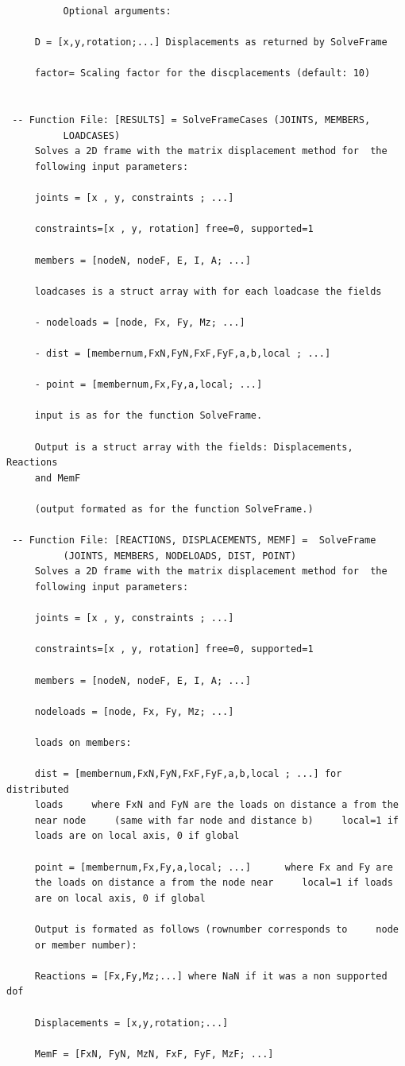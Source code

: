 \documentclass[a4paper]{article}
\begin{document}
\begin{verbatim}
     	  Optional arguments:

     D = [x,y,rotation;...] Displacements as returned by SolveFrame

     factor= Scaling factor for the discplacements (default: 10)


 -- Function File: [RESULTS] = SolveFrameCases (JOINTS, MEMBERS,
          LOADCASES)
     Solves a 2D frame with the matrix displacement method for  the
     following input parameters:

     joints = [x , y, constraints ; ...]

     constraints=[x , y, rotation] free=0, supported=1

     members = [nodeN, nodeF, E, I, A; ...]

     loadcases is a struct array with for each loadcase the fields

     - nodeloads = [node, Fx, Fy, Mz; ...]

     - dist = [membernum,FxN,FyN,FxF,FyF,a,b,local ; ...]

     - point = [membernum,Fx,Fy,a,local; ...]

     input is as for the function SolveFrame.

     Output is a struct array with the fields: Displacements, Reactions
     and MemF

     (output formated as for the function SolveFrame.)

 -- Function File: [REACTIONS, DISPLACEMENTS, MEMF] =  SolveFrame
          (JOINTS, MEMBERS, NODELOADS, DIST, POINT)
     Solves a 2D frame with the matrix displacement method for  the
     following input parameters:

     joints = [x , y, constraints ; ...]

     constraints=[x , y, rotation] free=0, supported=1

     members = [nodeN, nodeF, E, I, A; ...]

     nodeloads = [node, Fx, Fy, Mz; ...]

     loads on members:

     dist = [membernum,FxN,FyN,FxF,FyF,a,b,local ; ...] for distributed
     loads     where FxN and FyN are the loads on distance a from the
     near node     (same with far node and distance b)     local=1 if
     loads are on local axis, 0 if global

     point = [membernum,Fx,Fy,a,local; ...]      where Fx and Fy are
     the loads on distance a from the node near     local=1 if loads
     are on local axis, 0 if global

     Output is formated as follows (rownumber corresponds to     node
     or member number):

     Reactions = [Fx,Fy,Mz;...] where NaN if it was a non supported dof

     Displacements = [x,y,rotation;...]

     MemF = [FxN, FyN, MzN, FxF, FyF, MzF; ...]
	\end{verbatim}
\end{document}
